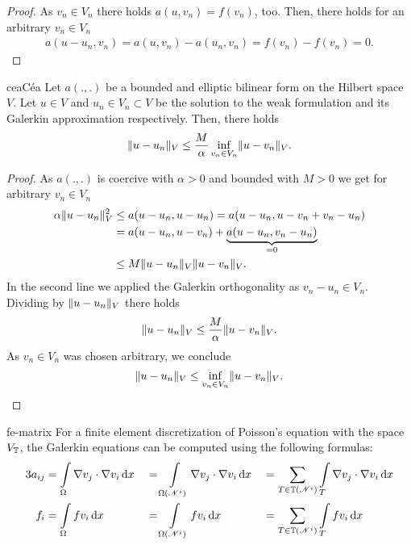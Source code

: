 \begin{proof}
  As $v_n\in V_n$ there holds $a(u,v_n)=f(v_n)$, too.
  Then, there holds for an arbitrary $v_n\in V_n$
  \begin{gather*}
    a(u-u_n,v_n)=a(u,v_n)-a(u_n,v_n)=f(v_n)-f(v_n)=0.
  \end{gather*}
\end{proof}

\begin{Lemma*}{cea}{Céa}
  Let $a(.,.)$ be a bounded and elliptic bilinear form on the Hilbert
  space $V$.  Let $u \in V$ and $u_n\in V_n \subset V$ be
  the solution to the weak formulation and its Galerkin approximation
  respectively. Then, there holds
  \begin{gather}
    \lVert u-u_n\rVert_V \le \frac{M}{\alpha}
    \inf_{v_n\in V_n}\lVert u-v_n\rVert_V.
  \end{gather}
\end{Lemma*}

\begin{proof}
  As $a(.,.)$ is coercive with $\alpha>0$ and bounded with $M>0$
  we get for arbitrary $v_n\in V_n$
  \begin{gather*}
    \begin{aligned}
      \alpha \lVert u-u_n\rVert_V^2 &\le a(u-u_n,u-u_n) = a(u-u_n,u-v_n+v_n-u_n) \\
      &= a(u-u_n,u-v_n) + \underbrace{a(u-u_n,v_n-u_n)}_{=0} \\
      &\le M \lVert u-u_n\rVert_V \lVert u-v_n\rVert_V.
    \end{aligned}
  \end{gather*}
  In the second line we applied the Galerkin orthogonality
  as $v_n-u_n\in V_n$. Dividing by $\lVert u-u_n\rVert_V$ there holds
  \begin{gather*}
    \lVert u-u_n\rVert_V \leq \frac{M}{\alpha} \lVert u-v_n\rVert_V.
  \end{gather*}
  As $v_n\in V_n$ was chosen arbitrary, we conclude
  \begin{gather*}
    \lVert u-u_n\rVert_V \le \inf_{v_n\in V_n} \lVert u-v_n\rVert_V.
  \end{gather*}
\end{proof}

\begin{Lemma}{fe-matrix}
  For a finite element discretization of Poisson's equation with the
  space $V_\mathbb T$, the Galerkin equations can be computed using the
  following formulas:
  \begin{alignat*}3
    a_{ij} &= \int\limits_\domain \nabla v_j \cdot \nabla v_i \dx
    &&= \int\limits_{\domain(\nodal^i)} \nabla v_j \cdot \nabla v_i \dx
    &&= \sum_{\cell\in\mesh(\nodal^i)}\int\limits_\cell \nabla v_j \cdot \nabla v_i \dx\\
    f_{i} &= \int\limits_\domain f v_i \dx
    &&= \int\limits_{\domain(\nodal^i)} f v_i \dx
    &&= \sum_{\cell\in\mesh(\nodal^i)}\int\limits_\cell f v_i \dx
  \end{alignat*}
\end{Lemma}

